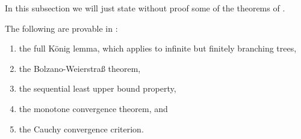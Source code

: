 \documentclass[../main.tex]{memoir}
\begin{document}
In this subsection we will just state without proof some of the theorems of \aca.

\begin{theorem}
  The following are provable in \aca:

  \begin{enumerate}
  \item the full König lemma, which applies to infinite but finitely branching trees,
  \item the Bolzano-Weierstra{\ss} theorem,
  \item the sequential least upper bound property,
  \item the monotone convergence theorem, and
  \item the Cauchy convergence criterion.
  \end{enumerate}
\end{theorem}
\end{document}
